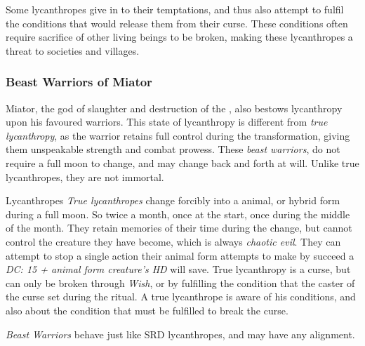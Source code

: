 Some lycanthropes give in to their temptations, and thus also attempt to
fulfil the conditions that would release them from their curse. These
conditions often require sacrifice of other living beings to be broken, making
these lycanthropes a threat to societies and villages.

\subsubsection{Beast Warriors of Miator}
\label{sec:Beast Warriors}

Miator, the god of slaughter and destruction of the ,
also bestows lycanthropy upon his favoured warriors. This state of lycanthropy
is different from \emph{true lycanthropy}, as the warrior retains full control
during the transformation, giving them unspeakable strength and combat prowess.
These \emph{beast warriors}, do not require a full moon to change, and may
change back and forth at will. Unlike true lycanthropes, they are not immortal.

\begin{35e}{Lycanthropes}
  \emph{True lycanthropes} change forcibly into a animal, or hybrid form
  during a full moon. So twice a month, once at the start, once during the
  middle of the month. They retain memories of their time during the
  change, but cannot control the creature they have become, which is always
  \emph{chaotic evil}. They can attempt to stop a single action their animal
  form attempts to make by succeed a \emph{DC: 15 + animal form creature's HD}
  will save. True lycanthropy is a curse, but can only be broken through
  \emph{Wish}, or by fulfilling the condition that the caster of the curse set
  during the ritual. A true lycanthrope is aware of his conditions, and also
  about the condition that must be fulfilled to break the curse.

  \emph{Beast Warriors} behave just like SRD lycanthropes, and may have any
  alignment.
\end{35e}
